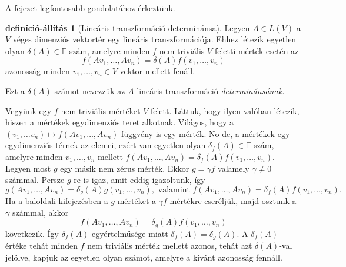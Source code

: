 \documentclass[9pt, a4paper, showtrims]{memoir}
\makeatletter
\renewenvironment{proof}[1][\proofname]
    {\par\pushQED{\qed}%
    \normalfont \topsep6\p@\@plus6\p@\relax
    \trivlist
    \item[\hskip\labelsep
        \itshape
    #1\@addpunct{:}]\ignorespaces}
    {\popQED\endtrivlist\@endpefalse}
\theoremstyle{plain}
\theoremstyle{remark}
\theoremstyle{definition}
\newtheorem{defprop}[proposition]{definíció-állítás}
\makeatother
\begin{document}
A fejezet legfontosabb gondolatához érkeztünk.
\begin{defprop}[Lineáris transzformáció determinánsa]
	Legyen $A\in L\left( V \right)$ a $V$ véges dimenziós vektortér egy lineáris transzformációja.
	Ehhez létezik egyetlen olyan $\delta\left( A \right)\in\mathbb{F}$ szám,
	amelyre minden $f$ nem triviális $V$ feletti mérték esetén az
	\[
		f\left( Av_1,\ldots,Av_n \right)
		=
		\delta\left( A \right)
		f\left( v_1,\ldots,v_n \right)
	\]
	azonosság minden $v_1,\ldots,v_n\in V$ vektor mellett fenáll.

	Ezt a $\delta\left( A \right)$ számot nevezzük az $A$ lineáris transzformáció \emph{determinánsának.}
\end{defprop}
\begin{proof}
	Vegyünk egy $f$ nem triviális mértéket $V$ felett.
	Láttuk, hogy ilyen valóban létezik, hiszen a mértékek egydimenziós teret alkotnak.
	Világos, hogy a $\left( v_1,\ldots v_{n}\right) \mapsto f\left( Av_{1},\ldots ,Av_{n}\right) $
	függvény is egy mérték.
	No de, a mértékek egy egydimenziós térnek az elemei,
	ezért van egyetlen olyan $\delta _{f}\left( A\right)\in\mathbb{F} $ szám,
	amelyre minden
	$
		v_{1},\ldots ,v_{n}
	$
	mellett
	$
		f\left( Av_{1},\ldots,Av_{n}\right)
		=
		\delta _{f}\left( A\right) f\left( v_{1},\ldots,v_{n}\right)
	$.
	Legyen most $g$ egy másik nem zérus mérték.
	Ekkor
	$g=\gamma f$ valamely $\gamma\neq 0$ számmal.
	Persze $g$-re is igaz, amit eddig igazoltunk,
	így
	\begin{displaymath}
		g\left( Av_{1},\ldots ,Av_{n}\right)
		=
		\delta_{g}\left( A\right) g\left( v_{1},\ldots ,v_{n}\right),
		\text{ valamint }
		f\left( Av_{1},\ldots,Av_{n}\right)
		=
		\delta _{f}\left( A\right) f\left( v_{1},\ldots,v_{n}\right).
	\end{displaymath}
	Ha a baloldali kifejezésben a $g$ mértéket a $\gamma f$ mértékre cseréljük,
	majd osztunk a $\gamma$ számmal,
	akkor
	\[
		f\left(Av_{1},\ldots ,Av_{n}\right)
		=
		\delta _{g}\left( A\right) f\left(v_{1},\ldots ,v_{n}\right)
	\]
	következik.
	Így $\delta _{f}\left( A\right) $ egyértelműsége miatt
	$
		\delta _{f}\left( A\right) =\delta _{g}\left( A\right).
	$
	A $\delta_f\left( A \right)$ értéke tehát minden $f$ nem triviális mérték mellett azonos,
	tehát azt $\delta(A)$-val jelölve, kapjuk az egyetlen olyan számot,
	amelyre a kívánt azonosság fennáll.
\end{proof}
\end{document}
